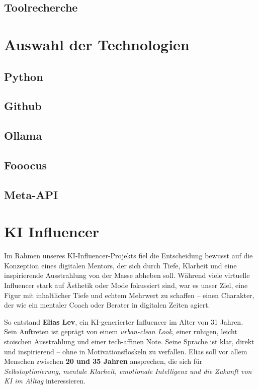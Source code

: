 \documentclass[a4paper,12pt]{article}
\begin{document}
\subsection{Toolrecherche}

\section{Auswahl der Technologien}
\subsection{Python}
\subsection{Github}
\subsection{Ollama}
\subsection{Fooocus}
\subsection{Meta-API}


\section{KI Influencer}

Im Rahmen unseres KI-Influencer-Projekts fiel die Entscheidung bewusst auf die Konzeption eines digitalen Mentors, der sich durch Tiefe, Klarheit und eine inspirierende Ausstrahlung von der Masse abheben soll. Während viele virtuelle Influencer stark auf Ästhetik oder Mode fokussiert sind, war es unser Ziel, eine Figur mit inhaltlicher Tiefe und echtem Mehrwert zu schaffen – einen Charakter, der wie ein mentaler Coach oder Berater in digitalen Zeiten agiert.

So entstand \textbf{Elias Lev}, ein KI-generierter Influencer im Alter von 31 Jahren. Sein Auftreten ist geprägt von einem \textit{urban-clean Look}, einer ruhigen, leicht stoischen Ausstrahlung und einer tech-affinen Note. Seine Sprache ist klar, direkt und inspirierend – ohne in Motivationsfloskeln zu verfallen. Elias soll vor allem Menschen zwischen \textbf{20 und 35 Jahren} ansprechen, die sich für \textit{Selbstoptimierung, mentale Klarheit, emotionale Intelligenz und die Zukunft von KI im Alltag} interessieren.
\end{document}

